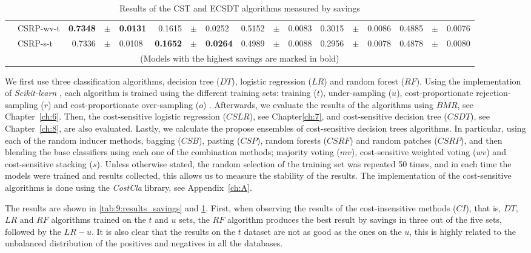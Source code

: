 {\begin{table}[!t]
{\begin{tabular}{l l r@{\hskip 0in}c@{\hskip 0in}l r@{\hskip 0in}c@{\hskip 0in}l r@{\hskip 
    0in}c@{\hskip 0in}l  r@{\hskip 0in}c@{\hskip 0in}l r@{\hskip 0in}c@{\hskip 0in}l}
&CSRP-wv-t & \bf{0.7348} &\bf{$\pm$}& \bf{0.0131} & 0.1615 &$\pm$& 0.0252 & 0.5152 &$\pm$& 0.0083 & 0.3015 &$\pm$& 0.0086 & 0.4885 &$\pm$& 0.0076\\
&CSRP-s-t & 0.7336 &$\pm$& 0.0108 & \bf{0.1652} &\bf{$\pm$}& \bf{0.0264} & 0.4989 &$\pm$& 0.0088& 0.2956 &$\pm$& 0.0078 & 0.4878 &$\pm$& 0.0080 \\
  \hline
  \multicolumn{17}{c}{(Models with the highest savings are marked in bold)}
  \end{tabular}
  }
    \caption{Results of the CST and ECSDT algorithms measured by savings}
    \label{tab:9:results_savings2}
  \end{table}

  We first use three classification algorithms, decision tree ($DT$), logistic 
  regression ($LR$) and random forest ($RF$). Using the implementation of \textit{Scikit-learn} 
  \citep{Pedregosa2011}, each algorithm is trained using the different training sets: training 
  ($t$), under-sampling ($u$), cost-proportionate rejection-sampling  ($r$) \citep{Zadrozny2003}   
  and   cost-proportionate over-sampling ($o$) \citep{Elkan2001}. Afterwards,  we evaluate the 
  results of  the algorithms using $BMR$, see Chapter~\ref{ch:6}. Then, the cost-sensitive 
  logistic  regression ($CSLR$), see Chapter\ref{ch:7}, and cost-sensitive decision tree ($CSDT$), 
  see Chapter~\ref{ch:8}, are also evaluated. Lastly, we calculate the propose ensembles of 
  cost-sensitive decision trees algorithms. In particular, using each of the random inducer 
  methods, bagging ($CSB$), pasting ($CSP$), random forests ($CSRF$) and random patches ($CSRP$), 
  and then blending the base classifiers using each one of the combination methods; majority 
  voting ($mv$), cost-sensitive weighted voting ($wv$) and cost-sensitive stacking ($s$). Unless 
  otherwise stated, the random selection of the training set was repeated 50 times, and in each 
  time the models were trained and results collected, this allows us to measure the stability of 
  the results. The implementation of the cost-sensitive algorithms is done using 
  the \textit{CostCla} library, see Appendix~\ref{ch:A}.
  
    The results are shown in \tablename{ \ref{tab:9:results_savings}} and \tablename{ \ref{tab:9:results_savings2}}. First, when observing  the 
  results of the cost-insensitive methods ($CI$), that is, $DT$, $LR$ and $RF$ algorithms trained 
  on the $t$ and $u$ sets, the $RF$ algorithm produces the best result by savings in three out of 
  the five sets, followed by the $LR-u$. It is also clear that the results on the $t$ dataset are 
  not as good as the ones on the $u$, this is highly related to the unbalanced distribution of the 
  positives and negatives in all the databases.
    
}
